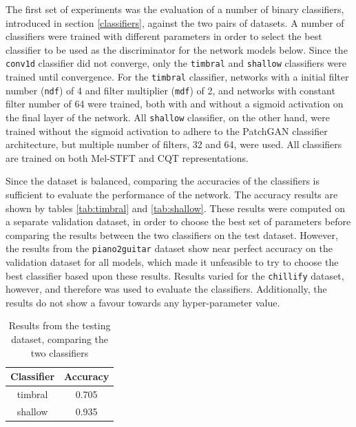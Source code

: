 \documentclass[12pt,a4paper,]{report}
\begin{document}
The first set of experiments was the evaluation of a number of binary
classifiers, introduced in section \ref{classifiers}, against the two
pairs of datasets. A number of classifiers were trained with different
parameters in order to select the best classifier to be used as the
discriminator for the network models below. Since the \texttt{conv1d}
classifier did not converge, only the \texttt{timbral} and
\texttt{shallow} classifiers were trained until convergence. For the
\texttt{timbral} classifier, networks with a initial filter number
(\texttt{ndf}) of 4 and filter multiplier (\texttt{mdf}) of 2, and
networks with constant filter number of 64 were trained, both with and
without a sigmoid activation on the final layer of the network. All
\texttt{shallow} classifier, on the other hand, were trained without the
sigmoid activation to adhere to the PatchGAN classifier architecture,
but multiple number of filters, 32 and 64, were used. All classifiers
are trained on both Mel-STFT and CQT representations.

Since the dataset is balanced, comparing the accuracies of the
classifiers is sufficient to evaluate the performance of the network.
The accuracy results are shown by tables \ref{tab:timbral} and
\ref{tab:shallow}. These results were computed on a separate validation
dataset, in order to choose the best set of parameters before comparing
the results between the two classifiers on the test dataset. However,
the results from the \texttt{piano2guitar} dataset show near perfect
accuracy on the validation dataset for all models, which made it
unfeasible to try to choose the best classifier based upon these
results. Results varied for the \texttt{chillify} dataset, however, and
therefore was used to evaluate the classifiers. Additionally, the
results do not show a favour towards any hyper-parameter value.

\begin{table}[]
\begin{tabular}{cc}
\hline
Classifier & Accuracy \\ \hline
timbral    & 0.705     \\
shallow    & 0.935   \\ \hline
\end{tabular}
\centering
\caption{Results from the testing dataset, comparing the two classifiers} \label{tab:classifier}
\end{table}
\end{document}
